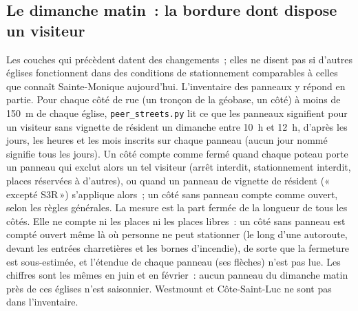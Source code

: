\documentclass[11pt,letterpaper]{article}
\begin{document}
\subsection{Le dimanche matin~: la bordure dont dispose un visiteur}\label{sec:sunday}

Les couches qui précèdent datent des changements~; elles ne disent pas si d'autres églises fonctionnent dans des conditions de stationnement comparables à celles que connaît Sainte-Monique aujourd'hui. L'inventaire des panneaux y répond en partie. Pour chaque côté de rue (un tronçon de la géobase, un côté) à moins de 150~m de chaque église, \texttt{peer\_streets.py} lit ce que les panneaux signifient pour un visiteur sans vignette de résident un dimanche entre 10~h et 12~h, d'après les jours, les heures et les mois inscrits sur chaque panneau (aucun jour nommé signifie tous les jours). Un côté compte comme fermé quand chaque poteau porte un panneau qui exclut alors un tel visiteur (arrêt interdit, stationnement interdit, places réservées à d'autres), ou quand un panneau de vignette de résident («\,excepté S3R\,») s'applique alors~; un côté sans panneau compte comme ouvert, selon les règles générales. La mesure est la part fermée de la longueur de tous les côtés. Elle ne compte ni les places ni les places libres~: un côté sans panneau est compté ouvert même là où personne ne peut stationner (le long d'une autoroute, devant les entrées charretières et les bornes d'incendie), de sorte que la fermeture est sous-estimée, et l'étendue de chaque panneau (ses flèches) n'est pas lue. Les chiffres sont les mêmes en juin et en février~: aucun panneau du dimanche matin près de ces églises n'est saisonnier. Westmount et Côte-Saint-Luc ne sont pas dans l'inventaire.

\begin{center}\small\resizebox{\textwidth}{!}{}\end{center}
\end{document}
